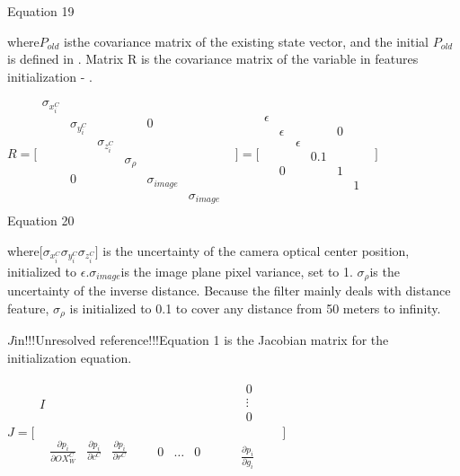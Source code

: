 Equation 19

where$P_{old}$ isthe covariance matrix of the existing state vector, 
and the initial $P_{old}$is defined in . Matrix R is the covariance 
matrix of the variable in features initialization - .

$R=\lbrack \begin{matrix}
\sigma _{x_{i}^{C}} & & & & & & \\
 & \sigma _{y_{i}^{C}} & & & 0 & & \\
 & & \sigma _{z_{i}^{C}} & & & & \\
 & & & \sigma _{\rho } & & & \\
 & 0 & & & \sigma _{image} & & \\
 & & & & & \sigma _{image} & \\
\end{matrix}
\rbrack =\lbrack \begin{matrix}
\epsilon & & & & & & \\
 & \epsilon & & & 0 & & \\
 & & \epsilon & & & & \\
 & & & 0.1 & & & \\
 & 0 & & & 1 & & \\
 & & & & & 1 & \\
\end{matrix}
\rbrack $\\


Equation 20

where$[\sigma _{x_{i}^{C}}\sigma _{y_{i}^{C}}\sigma _{z_{i}^{C}}$$]$ 
is the uncertainty of the camera optical center position, initialized to 
$\epsilon $.$\sigma _{image}$is the image plane pixel variance, 
set to 1. $\sigma _{\rho }$is the uncertainty of the inverse 
distance. Because the filter mainly deals with distance feature, $
\sigma _{\rho }$ is initialized to 0.1 to cover any distance from 50 
meters to infinity. 

$J$in!!!Unresolved reference!!!Equation 1 is the Jacobian matrix for 
the initialization equation. 

$J=\lbrack \begin{matrix}
I & \begin{matrix}
0 & \\
\vdots & \\
0 & \\
\end{matrix}
 & \\
\begin{matrix}
\begin{matrix}
\frac{\partial p_{i}}{\partial OX_{W}^{C}} & \frac{\partial 
p_{i}}{\partial c^{C}} & \frac{\partial p_{i}}{\partial r^{C}} & \\
\end{matrix}
 & \begin{matrix}
0 & \ldots & 0 & \\
\end{matrix}
 & \\
\end{matrix}
 & \frac{\partial p_{i}}{\partial g_{i}} & \\
\end{matrix}
\rbrack $\\


